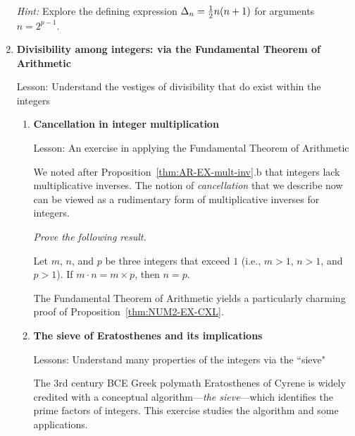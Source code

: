 \begin{enumerate}
\medskip

{\em Hint:} Explore the defining expression $\Delta_{n} = {1 \over 2} n(n+1)$ for arguments $n = 2^{p-1}$. 


\medskip\item
{\bf Divisibility among integers: via the Fundamental Theorem of Arithmetic}

{\sc Lesson:} Understand the vestiges of divisibility that do exist within the integers

  \begin{enumerate}
  \item
{\bf Cancellation in integer multiplication}

{\sc Lesson:} An exercise in applying the Fundamental Theorem of Arithmetic

\smallskip


We noted after Proposition~\ref{thm:AR-EX-mult-inv}.b that integers lack multiplicative inverses.  The notion of {\it cancellation} that we describe now can be viewed as a rudimentary form of multiplicative inverses for integers.

\smallskip

{\em Prove the following result.}

\begin{prop}
\label{thm:NUM2-EX-CXL}
Let $m$, $n$, and $p$ be three integers that exceed $1$ (i.e., $m>1$, $n>1$, and $p >1$).  If $m \cdot n = m \times p$, then $n = p$.
\end{prop}

The Fundamental Theorem of Arithmetic yields a particularly charming proof of Proposition~\ref{thm:NUM2-EX-CXL}.
\medskip

  \medskip\item
{\bf The sieve of Eratosthenes and its implications}

{\sc Lessons:} Understand many properties of the integers via the ``sieve"


\smallskip

The 3rd century BCE Greek polymath Eratosthenes of Cyrene is widely credited with a conceptual algorithm---{\it the sieve}---which identifies the prime factors of integers.  This exercise studies the algorithm and some applications.


\end{enumerate}
\end{enumerate}
